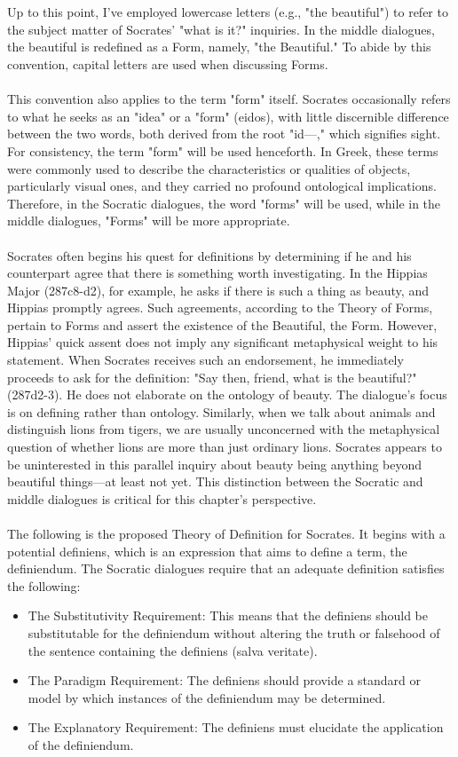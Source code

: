 \\
\\
Up to this point, I've employed lowercase letters (e.g., "the beautiful") to refer to the subject matter of Socrates' "what is it?" inquiries. In the middle dialogues, the beautiful is redefined as a Form, namely, "the Beautiful." To abide by this convention, capital letters are used when discussing Forms.
\\
\\
This convention also applies to the term "form" itself. Socrates occasionally refers to what he seeks as an "idea" or a "form" (eidos), with little discernible difference between the two words, both derived from the root "id---," which signifies sight. For consistency, the term "form" will be used henceforth. In Greek, these terms were commonly used to describe the characteristics or qualities of objects, particularly visual ones, and they carried no profound ontological implications. Therefore, in the Socratic dialogues, the word "forms" will be used, while in the middle dialogues, "Forms" will be more appropriate.
\\
\\
Socrates often begins his quest for definitions by determining if he and his counterpart agree that there is something worth investigating. In the Hippias Major (287c8-d2), for example, he asks if there is such a thing as beauty, and Hippias promptly agrees. Such agreements, according to the Theory of Forms, pertain to Forms and assert the existence of the Beautiful, the Form. However, Hippias' quick assent does not imply any significant metaphysical weight to his statement. When Socrates receives such an endorsement, he immediately proceeds to ask for the definition: "Say then, friend, what is the beautiful?" (287d2-3). He does not elaborate on the ontology of beauty. The dialogue's focus is on defining rather than ontology. Similarly, when we talk about animals and distinguish lions from tigers, we are usually unconcerned with the metaphysical question of whether lions are more than just ordinary lions. Socrates appears to be uninterested in this parallel inquiry about beauty being anything beyond beautiful things—at least not yet. This distinction between the Socratic and middle dialogues is critical for this chapter's perspective.
\\
\\
The following is the proposed Theory of Definition for Socrates. It begins with a potential definiens, which is an expression that aims to define a term, the definiendum. The Socratic dialogues require that an adequate definition satisfies the following:
\begin{itemize}
    \item The Substitutivity Requirement: This means that the definiens should be substitutable for the definiendum without altering the truth or falsehood of the sentence containing the definiens (salva veritate).
    \item The Paradigm Requirement: The definiens should provide a standard or model by which instances of the definiendum may be determined.
    \item The Explanatory Requirement: The definiens must elucidate the application of the definiendum.
\end{itemize}